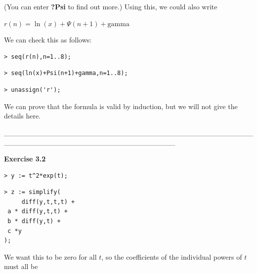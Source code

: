 \documentclass{article}
\begin{document}
\begin{Maple Normal}
(You can enter \textcolor[RGB]{255,0,0}{\textbf{?Psi}} to find out more.)  Using this, we could also write
\end{Maple Normal}
\begin{Maple Normal}

\end{Maple Normal}
\begin{center}
$\displaystyle r (n)=\ln (x)+\Psi (n +1)+\mathrm{gamma}$\end{center}
\begin{Maple Normal}
We can check this as follows:
\end{Maple Normal}
\begin{Maple Normal}

\end{Maple Normal}
\begin{lstlisting}
> seq(r(n),n=1..8);
\end{lstlisting}
\begin{lstlisting}
> seq(ln(x)+Psi(n+1)+gamma,n=1..8);
\end{lstlisting}
\begin{lstlisting}
> unassign('r');
\end{lstlisting}
\begin{Maple Normal}

\end{Maple Normal}
\begin{Maple Normal}
We can prove that the formula is valid by induction, but we will not give the details here. 
\end{Maple Normal}
\begin{Maple Normal}
\_\_\_\_\_\_\_\_\_\_\_\_\_\_\_\_\_\_\_\_\_\_\_\_\_\_\_\_\_\_\_\_\_\_\_\_\_\_\_\_\_\_\_\_\_\_\_\_\_\_\_\_\_\_\_\_\_\_\_\_\_\_\_\_\_\_\_\_\_\_\_\_\_\_\_\_\_\_\_\_\_
\end{Maple Normal}
\begin{Maple Heading 2}
\textbf{Exercise 3.2}
\end{Maple Heading 2}
\begin{lstlisting}
> y := t^2*exp(t);
\end{lstlisting}
\begin{lstlisting}
> z := simplify(
     diff(y,t,t,t) + 
 a * diff(y,t,t) + 
 b * diff(y,t) +
 c *y
); 
\end{lstlisting}
\begin{Maple Normal}
We want this to be zero for all 
$t$, so the coefficients of the individual powers of 
$t$ must all be
\end{Maple Normal}
\end{document}
